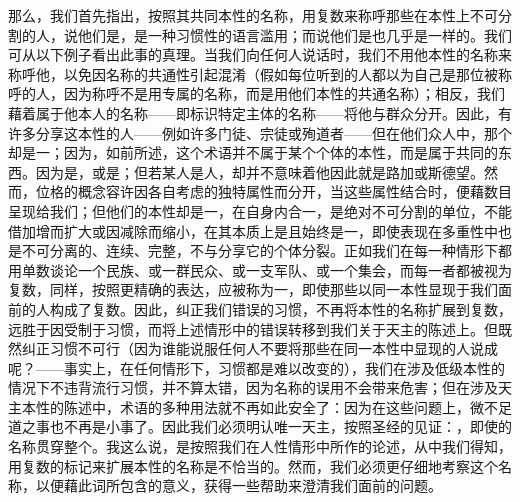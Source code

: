 那么，我们首先指出，按照其共同本性的名称，用复数来称呼那些在本性上不可分割的人，说他们是，是一种习惯性的语言滥用；而说他们是也几乎是一样的。我们可从以下例子看出此事的真理。当我们向任何人说话时，我们不用他本性的名称来称呼他，以免因名称的共通性引起混淆（假如每位听到的人都以为自己是那位被称呼的人，因为称呼不是用专属的名称，而是用他们本性的共通名称）；相反，我们藉着属于他本人的名称——即标识特定主体的名称——将他与群众分开。因此，有许多分享这本性的人——例如许多门徒、宗徒或殉道者——但在他们众人中，那个却是一；因为，如前所述，这个术语并不属于某个个体的本性，而是属于共同的东西。因为是，或是；但若某人是人，却并不意味着他因此就是路加或斯德望。然而，位格的概念容许因各自考虑的独特属性而分开，当这些属性结合时，便藉数目呈现给我们；但他们的本性却是一，在自身内合一，是绝对不可分割的单位，不能借加增而扩大或因减除而缩小，在其本质上是且始终是一，即使表现在多重性中也是不可分离的、连续、完整，不与分享它的个体分裂。正如我们在每一种情形下都用单数谈论一个民族、或一群民众、或一支军队、或一个集会，而每一者都被视为复数，同样，按照更精确的表达，应被称为一，即使那些以同一本性显现于我们面前的人构成了复数。因此，纠正我们错误的习惯，不再将本性的名称扩展到复数，远胜于因受制于习惯，而将上述情形中的错误转移到我们关于天主的陈述上。但既然纠正习惯不可行（因为谁能说服任何人不要将那些在同一本性中显现的人说成呢？——事实上，在任何情形下，习惯都是难以改变的），我们在涉及低级本性的情况下不违背流行习惯，并不算太错，因为名称的误用不会带来危害；但在涉及天主本性的陈述中，术语的多种用法就不再如此安全了：因为在这些问题上，微不足道之事也不再是小事了。因此我们必须明认唯一天主，按照圣经的见证：，即使的名称贯穿整个。我这么说，是按照我们在人性情形中所作的论述，从中我们得知，用复数的标记来扩展本性的名称是不恰当的。然而，我们必须更仔细地考察这个名称，以便藉此词所包含的意义，获得一些帮助来澄清我们面前的问题。\par

